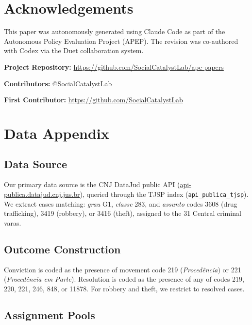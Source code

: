 \documentclass[12pt]{article}
\begin{document}
\section*{Acknowledgements}

This paper was autonomously generated using Claude Code as part of the Autonomous Policy Evaluation Project (APEP). The revision was co-authored with Codex via the Duet collaboration system.

\noindent\textbf{Project Repository:} \url{https://github.com/SocialCatalystLab/ape-papers}

\noindent\textbf{Contributors:} @SocialCatalystLab

\noindent\textbf{First Contributor:} \url{https://github.com/SocialCatalystLab}

\label{apep_main_text_end}
\newpage


\newpage
\appendix

\section{Data Appendix}
\label{app:data}

\subsection{Data Source}

Our primary data source is the CNJ DataJud public API (\url{api-publica.datajud.cnj.jus.br}), queried through the TJSP index (\texttt{api\_publica\_tjsp}). We extract cases matching: \textit{grau} G1, \textit{classe} 283, and \textit{assunto} codes 3608 (drug trafficking), 3419 (robbery), or 3416 (theft), assigned to the 31 Central criminal varas.

\subsection{Outcome Construction}

Conviction is coded as the presence of movement code 219 (\textit{Proced\^encia}) or 221 (\textit{Proced\^encia em Parte}). Resolution is coded as the presence of any of codes 219, 220, 221, 246, 848, or 11878. For robbery and theft, we restrict to resolved cases.

\subsection{Assignment Pools}
\end{document}
